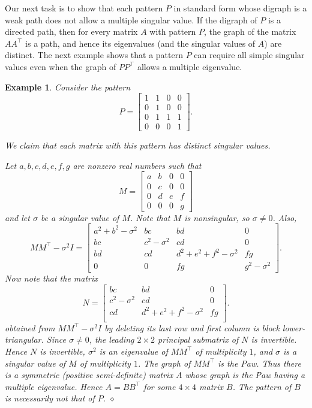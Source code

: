 \documentclass[preprint,12pt]{elsarticle}
\newcommand{\trans  }{^\top}
\newtheorem{Example}[theorem]{Example}
\begin{document}
Our next task is to show that each pattern $P$ in standard form 
whose digraph is a weak path
does not allow a multiple singular value.
If the digraph of $P$ is a directed path, then for every matrix $A$
with pattern $P$, the graph of the matrix $AA\trans $ is a path, 
and hence its eigenvalues (and the singular values of $A$) are 
distinct.  The next example shows that a pattern $P$ can require all simple singular values even when the graph of $PP\trans$ allows a multiple eigenvalue. 


\begin{Example}
\rm 
Consider the pattern 
\[ 
P=\left[ \begin{array}{cccc}
1 & 1 & 0 & 0\\
0 & 1 & 0 & 0\\
0 & 1 & 1 & 1\\
0 & 0 & 0 & 1
\end{array}
\right].
\]

We claim that each matrix with this pattern has distinct singular values.

 Let $a,b,c,d,e,f,g$ are nonzero real numbers
such that 
\[ 
M=\left[ \begin{array}{cccc}
a & b & 0 & 0\\
0 & c & 0 & 0\\
0 & d & e & f\\
0 & 0 & 0 & g
\end{array}
\right]
\]
and let $\sigma$ be a singular value of $M$.  
Note that $M$ is nonsingular, so $\sigma \neq 0$. 
Also, 
\[ 
MM\trans-\sigma^2 I=
\left[ \begin{array}{cccc}
a^2+b^2-\sigma^2 & bc & bd & 0\\
bc & c^2-\sigma^2 & cd & 0\\
bd & cd & d^2+e^2 + f^2 -\sigma^2 & fg\\
0 & 0 & fg & g^2-\sigma^2
\end{array}
\right].
\]
Now note that the matrix 
\[ 
N=
\left[ \begin{array}{cc|c}
 bc & bd & 0\\
 c^2-\sigma^2 & cd & 0\\ \hline
cd & d^2+e^2 + f^2 -\sigma^2 & fg\\
\end{array}
\right].
\]
obtained from $MM\trans -\sigma^2 I$
by deleting its last row and first column is block lower-triangular. Since $\sigma \neq 0$, the leading $2\times 2$ principal submatrix of $N$  is invertible. 
 Hence $N$ is invertible, $\sigma^2$ is an eigenvalue of $MM\trans$ of multiplicity $1$, and  $\sigma$ is a singular value of $M$ 
of multiplicity $1$. The graph of $MM\trans$ is the Paw. Thus there
is a symmetric (positive semi-definite) matrix $A$ whose graph is the Paw
having a multiple eigenvalue.  Hence $A=BB\trans$ for some $4\times 4$ matrix $B$. The pattern of $B$ is necessarily not that of $P$. 
$\diamond$
\end{Example}
\end{document}
